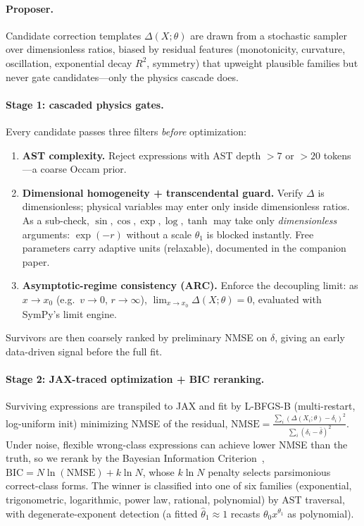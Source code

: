 \documentclass{article}
\begin{document}
\paragraph{Proposer.}
Candidate correction templates $\Delta(X;\theta)$ are drawn from a stochastic sampler over dimensionless ratios, biased by residual features (monotonicity, curvature, oscillation, exponential decay $R^2$, symmetry) that upweight plausible families but never gate candidates---only the physics cascade does.

\paragraph{Stage 1: cascaded physics gates.}
Every candidate passes three filters \emph{before} optimization:
\begin{enumerate}[leftmargin=16pt,label=\textbf{G\arabic*.},itemsep=1pt]
  \item \textbf{AST complexity.} Reject expressions with AST depth $>7$ or $>20$ tokens---a coarse Occam prior.
  \item \textbf{Dimensional homogeneity + transcendental guard.} Verify $\Delta$ is dimensionless; physical variables may enter only inside dimensionless ratios. As a sub-check, $\sin,\cos,\exp,\log,\tanh$ may take only \emph{dimensionless} arguments: $\exp(-r)$ without a scale $\theta_1$ is blocked instantly. Free parameters carry adaptive units (relaxable), documented in the companion paper.
  \item \textbf{Asymptotic-regime consistency (ARC).} Enforce the decoupling limit: as $x\to x_0$ (e.g.\ $v\!\to\!0$, $r\!\to\!\infty$), $\lim_{x\to x_0}\Delta(X;\theta)=0$, evaluated with SymPy's limit engine.
\end{enumerate}
Survivors are then coarsely ranked by preliminary NMSE on $\delta$, giving an early data-driven signal before the full fit.

\paragraph{Stage 2: JAX-traced optimization + BIC reranking.}
Surviving expressions are transpiled to JAX and fit by L-BFGS-B (multi-restart, log-uniform init) minimizing NMSE of the residual,
$\text{NMSE}=\tfrac{\sum_i(\Delta(X_i;\theta)-\delta_i)^2}{\sum_i(\delta_i-\bar\delta)^2}$.
Under noise, flexible wrong-class expressions can achieve lower NMSE than the truth, so we rerank by the Bayesian Information Criterion~\cite{schwarz1978bic,rissanen1978mdl}, $\text{BIC}=N\ln(\text{NMSE})+k\ln N$, whose $k\ln N$ penalty selects parsimonious correct-class forms. The winner is classified into one of six families (exponential, trigonometric, logarithmic, power law, rational, polynomial) by AST traversal, with degenerate-exponent detection (a fitted $\hat\theta_1\!\approx\!1$ recasts $\theta_0 x^{\theta_1}$ as polynomial).
\end{document}
